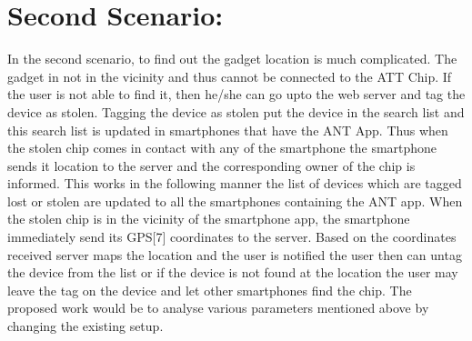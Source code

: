 \documentclass[a4paper,10pt]{report}
\begin{document}
\section{Second Scenario:}
In the second scenario, to find out the gadget location is much complicated. The gadget in not in the vicinity and thus cannot be connected to the ATT Chip. If the user is not able to find it, then he/she can go upto the web server and tag the device as stolen. Tagging the device as stolen put the device in the search list and this search list is updated in smartphones that have the ANT App. Thus when the stolen chip comes in contact with any of the smartphone the smartphone sends it location to the server and the corresponding owner of the chip is informed. This works in the following manner the list of devices which are tagged lost or stolen are updated to all the smartphones containing the ANT app. When the stolen chip is in the vicinity of the smartphone app, the smartphone immediately send its GPS[7] coordinates to the server. Based on the coordinates received server maps the location and the user is notified the user then can untag the device from the list or if the device is not found at the location the user may leave the tag on the device and let other smartphones find the chip. The proposed work would be to analyse various parameters mentioned above by changing the existing setup.

\newpage
{}
\end{document}
